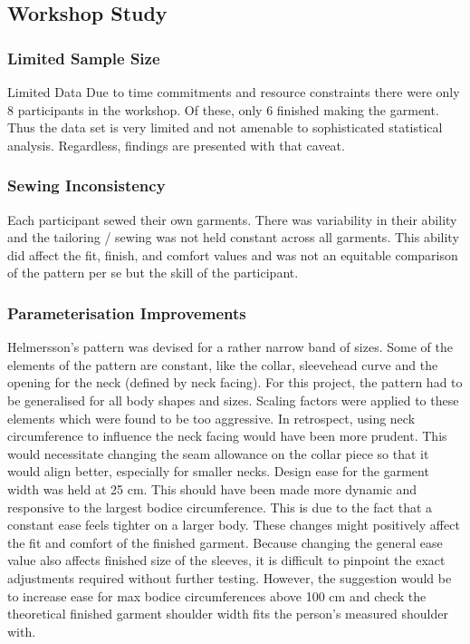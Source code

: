\subsection{Workshop Study}
\subsubsection{Limited Sample Size}
Limited Data
Due to time commitments and resource constraints there were only 8 participants in the workshop. Of these, only 6 finished making the garment. Thus the data set is very limited and not amenable to sophisticated statistical analysis. Regardless, findings are presented with that caveat.
\subsubsection{Sewing Inconsistency}

Each participant sewed their own garments. There was variability in their ability and the tailoring / sewing was not held constant across all garments. This ability did affect the fit, finish, and comfort values and was not an equitable comparison of the pattern per se but the skill of the participant.

\subsubsection{Parameterisation Improvements}
Helmersson’s pattern was devised for a rather narrow band of sizes. Some of the elements of the pattern are constant, like the collar, sleevehead curve and the opening for the neck (defined by neck facing). For this project, the pattern had to be generalised for all body shapes and sizes. Scaling factors were applied to these elements which were found to be too aggressive. In retrospect, using neck circumference to influence the neck facing would have been more prudent. This would necessitate changing the seam allowance on the collar piece so that it would align better, especially for smaller necks.
Design ease for the garment width was held at 25 cm. This should have been made more dynamic and responsive to the largest bodice circumference. This is due to the fact that a constant ease feels tighter on a larger body. These changes might positively affect the fit and comfort of the finished garment. Because changing the general ease value also affects finished size of the sleeves, it is difficult to pinpoint the exact adjustments required without further testing. However, the suggestion would be to increase ease for max bodice circumferences above 100 cm and check the theoretical finished garment shoulder width fits the person's measured shoulder with.

